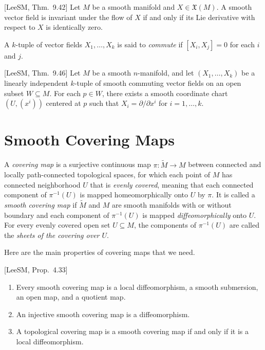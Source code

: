 \begin{proposition}
\label{prop:invariant-vector-field}
[LeeSM, Thm.~9.42] Let $M$ be a smooth manifold and $X \in \mathfrak{X}(M)$. A smooth vector field is invariant under the flow of $X$ if and only if its Lie derivative with respect to $X$ is identically zero.
\end{proposition}

A $k$-tuple of vector fields $X_1,\ldots,X_k$ is said to \emph{commute} if $[X_i, X_j] = 0$ for each $i$ and $j$.

\begin{proposition}
\label{prop:canonical-commuting-fields}
[LeeSM, Thm.~9.46] Let $M$ be a smooth $n$-manifold, and let $(X_1,\ldots,X_k)$ be a linearly independent $k$-tuple of smooth commuting vector fields on an open subset $W \subseteq M$. For each $p \in W$, there exists a smooth coordinate chart $(U, (x^i))$ centered at $p$ such that $X_i = \partial/\partial x^i$ for $i = 1,\ldots,k$.
\end{proposition}

\section{Smooth Covering Maps}

A \emph{covering map} is a surjective continuous map $\pi: \tilde{M} \to M$ between connected and locally path-connected topological spaces, for which each point of $M$ has connected neighborhood $U$ that is \emph{evenly covered}, meaning that each connected component of $\pi^{-1}(U)$ is mapped homeomorphically onto $U$ by $\pi$. It is called a \emph{smooth covering map} if $\tilde{M}$ and $M$ are smooth manifolds with or without boundary and each component of $\pi^{-1}(U)$ is mapped \emph{diffeomorphically} onto $U$. For every evenly covered open set $U \subseteq M$, the components of $\pi^{-1}(U)$ are called the \emph{sheets of the covering over $U$}.

Here are the main properties of covering maps that we need.

\begin{proposition}
\label{prop:elementary-covering-maps}
[LeeSM, Prop.~4.33]
\begin{enumerate}[label=(\alph*)]
\item Every smooth covering map is a local diffeomorphism, a smooth submersion, an open map, and a quotient map.
\item An injective smooth covering map is a diffeomorphism.
\item A topological covering map is a smooth covering map if and only if it is a local diffeomorphism.
\end{enumerate}
\end{proposition}

